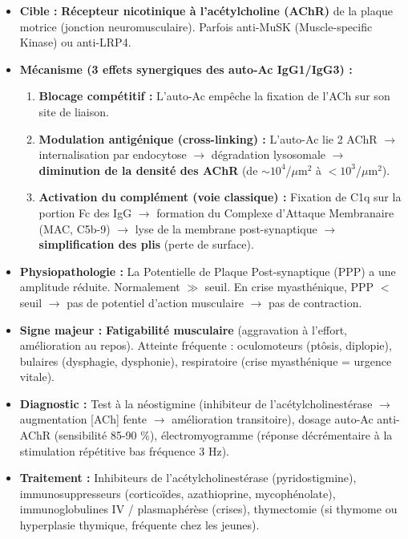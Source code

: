 \documentclass[11pt]{article}
\begin{document}
\begin{propriete}
\begin{itemize}
    \item \textbf{Cible :} \textbf{Récepteur nicotinique à l'acétylcholine (AChR)} de la plaque motrice (jonction neuromusculaire). Parfois anti-MuSK (Muscle-specific Kinase) ou anti-LRP4.
    \item \textbf{Mécanisme (3 effets synergiques des auto-Ac IgG1/IgG3) :}
    \begin{enumerate}
        \item \textbf{Blocage compétitif :} L'auto-Ac empêche la fixation de l'ACh sur son site de liaison.
        \item \textbf{Modulation antigénique (cross-linking) :} L'auto-Ac lie 2 AChR $\rightarrow$ internalisation par endocytose $\rightarrow$ dégradation lysosomale $\rightarrow$ \textbf{diminution de la densité des AChR} (de $\sim 10^4$/$\mu$m$^2$ à $< 10^3$/$\mu$m$^2$).
        \item \textbf{Activation du complément (voie classique) :} Fixation de C1q sur la portion Fc des IgG $\rightarrow$ formation du Complexe d'Attaque Membranaire (MAC, C5b-9) $\rightarrow$ lyse de la membrane post-synaptique $\rightarrow$ \textbf{simplification des plis} (perte de surface).
    \end{enumerate}
    \item \textbf{Physiopathologie :} La Potentielle de Plaque Post-synaptique (PPP) a une amplitude réduite. Normalement $\gg$ seuil. En crise myasthénique, PPP $<$ seuil $\rightarrow$ pas de potentiel d'action musculaire $\rightarrow$ pas de contraction.
    \item \textbf{Signe majeur :} \textbf{Fatigabilité musculaire} (aggravation à l'effort, amélioration au repos). Atteinte fréquente : oculomoteurs (ptôsis, diplopie), bulaires (dysphagie, dysphonie), respiratoire (crise myasthénique = urgence vitale).
    \item \textbf{Diagnostic :} Test à la néostigmine (inhibiteur de l'acétylcholinestérase $\rightarrow$ augmentation [ACh] fente $\rightarrow$ amélioration transitoire), dosage auto-Ac anti-AChR (sensibilité 85-90 \%), électromyogramme (réponse décrémentaire à la stimulation répétitive bas fréquence 3 Hz).
    \item \textbf{Traitement :} Inhibiteurs de l'acétylcholinestérase (pyridostigmine), immunosuppresseurs (corticoïdes, azathioprine, mycophénolate), immunoglobulines IV / plasmaphérèse (crises), thymectomie (si thymome ou hyperplasie thymique, fréquente chez les jeunes).
\end{itemize}
\end{propriete}
\end{document}
